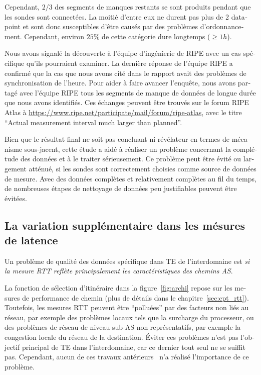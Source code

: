 \begin{otherlanguage}{french}
Cependant, $2/3$ des segments de manques restants se sont produits pendant que les sondes sont connectées.
La moitié d'entre eux ne durent pas plus de 2 datapoint et sont donc susceptibles d'être causés par des problèmes d'ordonnancement. 
Cependant, environ $25\%$ de cette catégorie dure longtemps ($\geq 1h$).

Nous avons signalé la découverte à l'équipe d'ingénierie de RIPE avec un cas spécifique qu'ils pourraient examiner.
La dernière réponse de l'équipe RIPE a confirmé que la cas que nous avons cité dans le rapport avait des problèmes de synchronisation de l'heure. 
Pour aider à faire avancer l'enquête, nous avons partagé avec l'équipe RIPE tous les segments de manque de données de longue durée que nous avons identifiés. 
Ces échanges peuvent être trouvés sur le forum RIPE Atlas à \url{https://www.ripe.net/participate/mail/forum/ripe-atlas}, avec le titre ``Actual measurement interval much larger than planned''.

Bien que le résultat final ne soit pas concluant ni révélateur en termes de mécanisme sous-jacent, cette étude a aidé à réaliser un problème concernant la complétude des données et à le traiter sérieusement.
Ce problème peut être évité ou largement atténué, si les sondes sont correctement choisies comme source de données de mesure.
Avec des données complètes et relativement complètes au fil du temps, de nombreuses étapes de nettoyage de données peu justifiables peuvent être évitées.

\subsection*{La variation supplémentaire dans les mésures de latence}

Un problème de qualité des données spécifique dans TE de l'interdomaine est \textit{si la mesure RTT reflète principalement les caractéristiques des chemins AS}.

La fonction de sélection d'itinéraire dans la figure~\ref{fig:archi} repose sur les mesures de performance de chemin (plus de détails dans le chapitre~\ref{sec:cpt_rtt}).
Toutefois, les mesures RTT peuvent être ``polluées'' par des facteurs non liés au réseau, par exemple des problèmes locaux tels que la surcharge du processeur,
 ou des problèmes de réseau de niveau sub-AS non représentatifs, par exemple la congestion locale du réseau de la destination.
Éviter ces problèmes n'est pas l'objectif principal de TE dans l'interdomaine, car ce dernier tout seul ne se suiffit pas.
Cependant, aucun de ces travaux antérieurs~\cite{Goldenberg2004, Akella2008} n'a réalisé l'importance de ce problème.


\end{otherlanguage}
